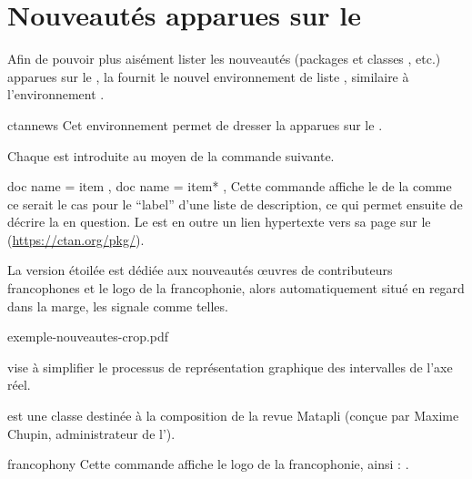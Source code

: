 \documentclass{letgut}
\begin{document}
\section{Nouveautés apparues sur le \ctan}
\label{sec:rubr-cons-aux}

Afin de pouvoir plus aisément lister les nouveautés (packages et classes
, etc.) apparues sur le \ctan{}, la  fournit le
nouvel environnement de liste , similaire à l'environnement
.
%
\begin{docEnvironment}[doclang/environment content=liste des nouveautés]{ctannews}{}
  Cet environnement permet de dresser la  apparues
  sur le \ctan{}.
\end{docEnvironment}
%
Chaque  est introduite au moyen de la commande 
suivante.
\begin{docCommands}[
  doc parameter = \oarg{nom},
  ]
  {
    { doc name = item },
    { doc name = item* },
  }
  Cette commande affiche le  de la  comme ce serait le
  cas pour le \enquote{label} d'une liste de description, ce qui permet ensuite
  de décrire la  en question. Le  est en outre un lien
  hypertexte vers sa page sur le \ctan{}
  (\url{https://ctan.org/pkg/}).

  La version étoilée  est dédiée aux nouveautés œuvres de
  contributeurs francophones et le logo de la francophonie, alors
  automatiquement situé en regard dans la marge, les signale comme telles.
\end{docCommands}

\begin{ltx-code-external-result}[title addon=nouveautés,listing options app={deletekeywords={[6]{hologo,matapli}}}]{exemple-nouveautes-crop.pdf}
\begin{ctannews}
\item[nl-interval] vise à simplifier le processus de
  représentation graphique des intervalles de l'axe réel.
\item*[matapli] est une classe  destinée à la
  composition de la revue Matapli (conçue par  Maxime Chupin,
  administrateur de l'\assogut{}).
\end{ctannews}
\end{ltx-code-external-result}

\begin{docCommand}{francophony}{}
  Cette commande affiche le logo de la francophonie, ainsi : \francophony.
\end{docCommand}
\end{document}
